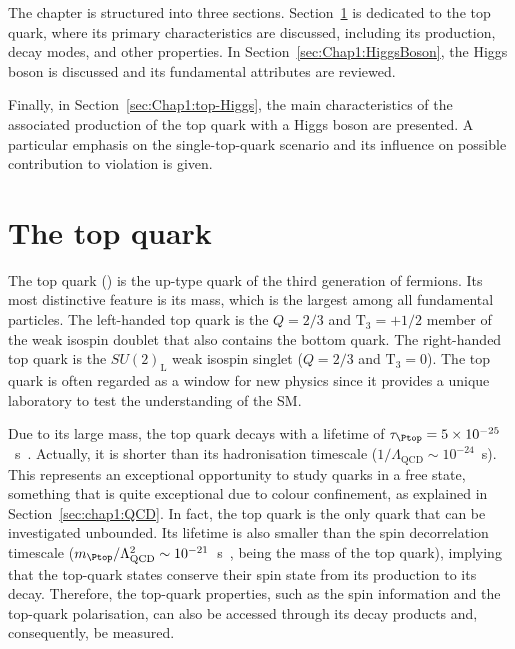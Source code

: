 The chapter is structured into three sections. Section~\ref{sec:Chap1:Top} is dedicated to
the top quark, where its primary characteristics are discussed, including its production, decay 
modes, and other properties.
In Section~\ref{sec:Chap1:HiggsBoson}, the Higgs boson is discussed and
its fundamental attributes are reviewed.

Finally, in Section~\ref{sec:Chap1:top-Higgs}, the main characteristics of the associated production 
of the top quark with a Higgs boson are presented.  A particular emphasis on the single-top-quark scenario and
its influence on possible contribution to \CP violation is given.




\section{The top quark}
\label{sec:Chap1:Top}
The top
quark (\Ptop) is the up-type quark of the third generation of fermions.
Its most distinctive feature is its mass, which is the largest among all %
fundamental particles. 
The left-handed top quark is the $Q=2/3$ and $\text{T}_{3} = +1/2$ member of the weak isospin
doublet that also contains the bottom quark. The right-handed top quark is the $SU(2)_\text{L}$
weak isospin singlet ($Q=2/3$ and $\text{T}_{3} = 0$). %
The top quark is often regarded  as a window for new physics
since it provides a unique laboratory to test the understanding of the SM. 

Due to its large mass, the top quark decays with a lifetime of $\tau_{\Ptop} = 5 \times 10^{-25}$~s~\cite{Taylor:1998uk}. 
Actually, it is shorter than its hadronisation timescale ($1/\Lambda_{\text{QCD}} \sim 10^{-24}$~s).
This represents an exceptional opportunity to study quarks in a free state, something that is quite exceptional
due to colour confinement, as explained  in Section~\ref{sec:chap1:QCD}. 
In fact, the top quark is the only quark that can be investigated unbounded. 
Its lifetime is also smaller than the spin decorrelation timescale ($\mtop /\Lambda^{2}_{\text{QCD}} \sim 10^{-21}$~s~\cite{Mahlon:2010gw}, being \mtop the mass of the top quark),
implying that the top-quark states conserve their spin state from its production to its decay.
Therefore, the top-quark properties, such as the spin information and the top-quark
polarisation, can also be accessed through its decay 
products and, consequently, be measured. %


